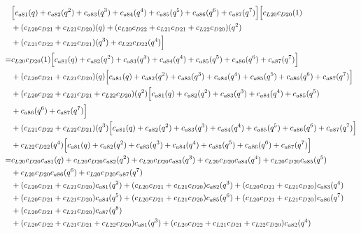 \documentclass[12pt]{article}
\begin{document}
\begin{align}
    &\Bigl[ c_{a81}(q) + c_{a82}(q^2) + c_{a83}(q^3) + c_{a84}(q^4) + c_{a85}(q^5) + c_{a86}(q^6) + c_{a87}(q^7) \Bigr] \Bigl[  c_{L20}c_{D20}(1) \nonumber\\
    &+ (c_{L20}c_{D21} + c_{L21}c_{D20})(q) + (c_{L20}c_{D22} + c_{L21}c_{D21} + c_{L22}c_{D20})(q^2) \nonumber\\
    &+ (c_{L21}c_{D22} + c_{L22}c_{D21})(q^3) +  c_{L22}c_{D22}(q^4) \Bigr]\\
    =&  c_{L20}c_{D20}(1)\Bigl[ c_{a81}(q) + c_{a82}(q^2) + c_{a83}(q^3) + c_{a84}(q^4) + c_{a85}(q^5) + c_{a86}(q^6) + c_{a87}(q^7) \Bigr] \nonumber\\
    &+ (c_{L20}c_{D21} + c_{L21}c_{D20})(q)\Bigl[ c_{a81}(q) + c_{a82}(q^2) + c_{a83}(q^3) + c_{a84}(q^4) + c_{a85}(q^5) + c_{a86}(q^6) + c_{a87}(q^7) \Bigr] \nonumber\\
    &+ (c_{L20}c_{D22} + c_{L21}c_{D21} + c_{L22}c_{D20})(q^2)\Bigl[ c_{a81}(q) + c_{a82}(q^2) + c_{a83}(q^3) + c_{a84}(q^4) + c_{a85}(q^5) \nonumber\\
    &+ c_{a86}(q^6) + c_{a87}(q^7) \Bigr] \nonumber\\
    &+ (c_{L21}c_{D22} + c_{L22}c_{D21})(q^3)\Bigl[ c_{a81}(q) + c_{a82}(q^2) + c_{a83}(q^3) + c_{a84}(q^4) + c_{a85}(q^5) + c_{a86}(q^6) + c_{a87}(q^7) \Bigr] \nonumber\\
    &+ c_{L22}c_{D22}(q^4)\Bigl[ c_{a81}(q) + c_{a82}(q^2) + c_{a83}(q^3) + c_{a84}(q^4) + c_{a85}(q^5) + c_{a86}(q^6) + c_{a87}(q^7) \Bigr] \\
    =&   c_{L20}c_{D20}c_{a81}(q) + c_{L20}c_{D20}c_{a82}(q^2) + c_{L20}c_{D20}c_{a83}(q^3) + c_{L20}c_{D20}c_{a84}(q^4) + c_{L20}c_{D20}c_{a85}(q^5) \nonumber\\
    &+ c_{L20}c_{D20}c_{a86}(q^6) + c_{L20}c_{D20}c_{a87}(q^7)  \nonumber\\
    &+  (c_{L20}c_{D21} + c_{L21}c_{D20})c_{a81}(q^2) + (c_{L20}c_{D21} + c_{L21}c_{D20})c_{a82}(q^3) + (c_{L20}c_{D21} + c_{L21}c_{D20})c_{a83}(q^4) \nonumber\\
    &+ (c_{L20}c_{D21} + c_{L21}c_{D20})c_{a84}(q^5) + (c_{L20}c_{D21} + c_{L21}c_{D20})c_{a85}(q^6) + (c_{L20}c_{D21} + c_{L21}c_{D20})c_{a86}(q^7) \nonumber\\
    &+ (c_{L20}c_{D21} + c_{L21}c_{D20})c_{a87}(q^8)  \nonumber\\
    &+ (c_{L20}c_{D22} + c_{L21}c_{D21} + c_{L22}c_{D20})c_{a81}(q^3) + (c_{L20}c_{D22} + c_{L21}c_{D21} + c_{L22}c_{D20})c_{a82}(q^4) \nonumber\\

\end{align}
\end{document}
